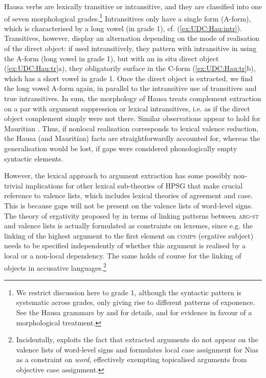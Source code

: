 \documentclass[output=paper
	        ,collection
	        ,collectionchapter
 	        ,biblatex
                ,babelshorthands
                ,newtxmath
                ,draftmode
                ,colorlinks, citecolor=brown
]{langscibook}
\begin{document}
{\begin{exe}
\end{exe}

\noindent
Hausa verbs are lexically transitive or intransitive, and they are
classified into one of seven morphological grades.\footnote{We
  restrict discussion here to grade 1, although the syntactic pattern
  is systematic across grades, only giving rise to different patterns
  of exponence. See the Hausa grammars by \citet{newman_p00} and
  \citet{jaggar01:_hausa} for details, and \citet{crysmann_b04yom} for
  evidence in favour of a morphological treatment. } Intransitives
only have a single form (A-form), which is characterised by a long
vowel (in grade 1), cf. (\ref{ex:UDC:Hau:intr}). Transitives, however,
display an alternation depending on the mode of realisation of the
direct object: if used intransitively, they pattern with intransitive
in using the A-form (long vowel in grade 1), but with an in situ
direct object (\ref{ex:UDC:Hau:tr}a), they obligatorily surface in the
C-form (\ref{ex:UDC:Hau:tr}b), which has a short vowel in grade
1. Once the direct object is extracted, we find the long vowel A-form
again, in parallel to the intransitive use of transitives and true
intransitives. In sum, the morphology of Hausa treats complement
extraction on a par with argument suppression or lexical
intransitives, i.e. as if the direct object complement simply were not
there. Similar observations appear to hold for Mauritian
\citep{Henri10}. Thus, if nonlocal realisation corresponds to lexical
valence reduction, the Hausa (and Mauritian) facts are
straightforwardly accounted for, whereas the generalisation would be
lost, if gaps were considered phonologically empty syntactic elements.


However, the lexical approach to argument extraction has some possibly
non-trivial implications for other lexical sub-theories of HPSG that
make crucial reference to valence lists, which includes lexical theories of
agreement and case. This is because gaps will not be present on the
valence lists of word-level signs. The theory of ergativity proposed by \citet{Manning:Sag:99} in terms of
linking patterns between \textsc{arg-st} and valence lists is
actually formulated as constraints on lexemes, since e.g. the linking
of the highest argument to the first element on \textsc{comps}
(ergative subject) needs to be specified independently of whether
this argument is realised by a local or a non-local dependency. The
same holds of course for the linking of objects in accusative
languages.\footnote{Incidentally, \citet{Crysmann:09} exploits the
  fact that extracted arguments do not appear on the valence lists of
  word-level signs and formulates local case assignment for Nias as a
  constraint on \textit{word}, effectively exempting topicalised
  arguments from objective case assignment. }

}
\end{document}
